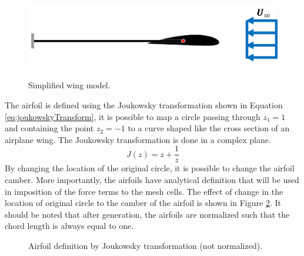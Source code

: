 \documentclass{aiaa-pretty}
\begin{document}
%
\begin{figure}
	\centering
	\includegraphics[height=3.75cm]{figure/airfoil/airfoil.png}
	\caption{Simplified wing model.}
	\label{fig:wingModel}
\end{figure}
%

The airfoil is defined using the Joukowsky transformation shown in Equation \eqref{eq:joukowskyTransform}, it is possible to map a circle passing through $z_1 = 1$ and containing the point $z_2 = -1$ to a curve shaped like the cross section of an airplane wing. The Joukowsky transformation is done in a complex plane.
%
\begin{equation}\label{eq:joukowskyTransform}
J(z) = z + \frac{1}{z}
\end{equation}
%
By changing the location of the original circle, it is possible to change the airfoil camber. More importantly, the airfoils have analytical definition that will be used in imposition of the force terms to the mesh cells. The effect of change in the location of original circle to the camber of the airfoil is shown in Figure \ref{fig:joukowskiChamber}. It should be noted that after generation, the airfoils are normalized such that the chord length is always equal to one.\\

%
	\begin{figure}[H]
		\centering
		\quad
		\caption{Airfoil definition by Joukowsky transformation (not normalized).}
		\label{fig:joukowskiChamber}
	\end{figure}
%
\end{document}
